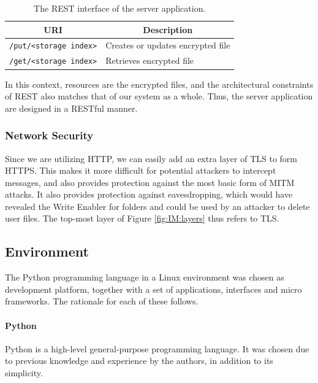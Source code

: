 \documentclass[pdftex,english,10pt,b5paper,twoside]{book}
\begin{document}
\begin{table}[h!]
    \centering
    \caption{The \acs{REST} interface of the server application.}
    \begin{tabular}{|l|l|}
        \hline
        \multicolumn{1}{|c}{\textbf{\acs{URI}}} & \multicolumn{1}{|c|}{\textbf{Description}} \\
        \hline
        \texttt{/put/<storage index>} & Creates or updates encrypted file \\
        \hline
        \texttt{/get/<storage index>} & Retrieves encrypted file \\
        \hline
    \end{tabular}
    \label{tbl:IM:restinterface}
\end{table}

In this context, resources are the encrypted files, and the architectural
constraints of \ac{REST} also matches that of our system as a
whole. Thus, the server application are designed in a \acs{REST}ful manner.

\subsubsection{Network Security} Since we are utilizing \ac{HTTP}, we can
easily add an extra layer of \ac{TLS} to form \ac{HTTPS}. This makes it more
difficult for potential attackers to intercept messages, and also provides
protection against the most basic form of \ac{MITM} attacks. It also provides
protection against eavesdropping, which would have revealed the Write Enabler
for folders and could be used by an attacker to delete user files. The top-most
layer of Figure \ref{fig:IM:layers} thus refers to \ac{TLS}.

\subsection{Environment}

The Python programming language in a Linux environment was chosen as development
platform, together with a set of applications, interfaces and micro frameworks.
The rationale for each of these follows.

\paragraph{Python} Python is a high-level general-purpose programming language.
It was chosen due to previous knowledge and experience by the
authors, in addition to its simplicity.
\end{document}
